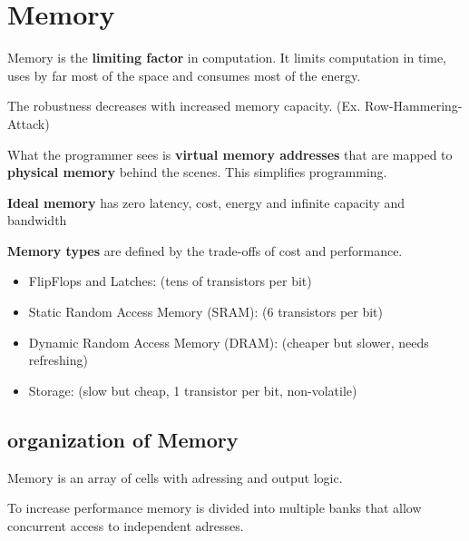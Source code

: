 \section{Memory}

\begin{remark}
	Memory is the \textbf{limiting factor} in computation. It limits computation in time, uses by far most of the space and consumes most of the energy.
\end{remark}

\begin{remark}
	The robustness decreases with increased memory capacity. (Ex. Row-Hammering-Attack)
\end{remark}

\begin{remark}
	What the programmer sees is \textbf{virtual memory addresses} that are mapped to \textbf{physical memory} behind the scenes. This simplifies programming.
\end{remark}

\begin{definition}
	\textbf{Ideal memory} has zero latency, cost, energy and infinite capacity and bandwidth
\end{definition}

\begin{definition}
	\textbf{Memory types} are defined by the trade-offs of cost and performance.
	\begin{itemize}
		\item FlipFlops and Latches: (tens of transistors per bit)
		\item Static Random Access Memory (SRAM): (6 transistors per bit)
		\item Dynamic Random Access Memory (DRAM): (cheaper but slower, needs refreshing)
		\item Storage: (slow but cheap, 1 transistor per bit, non-volatile)
	\end{itemize}
\end{definition}

\subsection{organization of Memory}

\begin{definition}
	Memory is an array of cells with adressing and output logic.
\end{definition}

\begin{remark}
	To increase performance memory is divided into multiple banks that allow concurrent access to independent adresses.
\end{remark}

